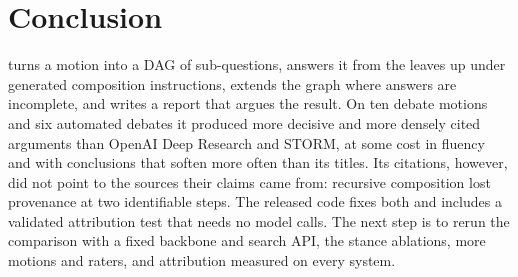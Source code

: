 \section{Conclusion}
\label{sec:conclusion}
\sys{} turns a motion into a DAG of sub-questions, answers it from the leaves up under generated composition instructions, extends the graph where answers are incomplete, and writes a report that argues the result. On ten debate motions and six automated debates it produced more decisive and more densely cited arguments than OpenAI Deep Research and STORM, at some cost in fluency and with conclusions that soften more often than its titles. Its citations, however, did not point to the sources their claims came from: recursive composition lost provenance at two identifiable steps. The released code fixes both and includes a validated attribution test that needs no model calls. The next step is to rerun the comparison with a fixed backbone and search API, the stance ablations, more motions and raters, and attribution measured on every system.
